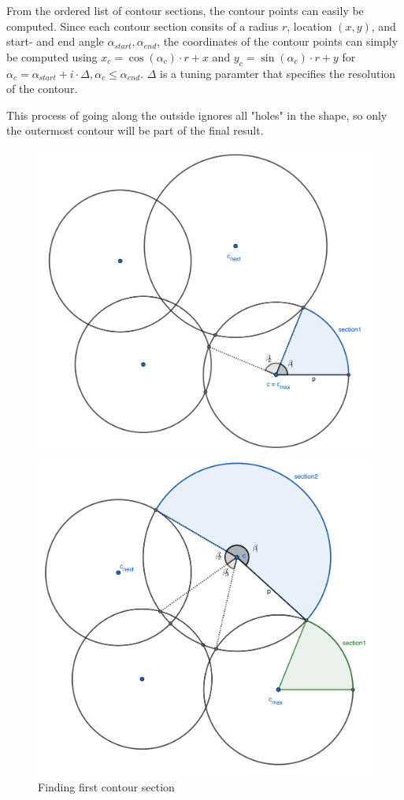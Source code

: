 From the ordered list of contour sections, the contour points can easily be computed.
Since each contour section consits of a radius $r$, location $(x,y)$, and start- and end angle $\alpha_{start}, \alpha_{end}$, the coordinates of the contour points can simply be computed using $x_c = \cos(\alpha_c) \cdot r + x$ and  $y_c = \sin(\alpha_c) \cdot r + y$ 
for $\alpha_c = \alpha_{start} + i \cdot \Delta, \alpha_c \leq \alpha_{end}$.
$\Delta$ is a tuning paramter that specifies the resolution of the contour.

This process of going along the outside ignores all "holes" in the shape, so only the outermost contour will be part of the final result. 

\begin{figure}[!htb]
    \includegraphics[width=1.0\textwidth]{figures/contour/c1copy.pdf}
    \caption{Finding first contour section}\label{fig:contour1}
  \endminipage\hfill
    \includegraphics[width=1.0\textwidth]{figures/contour/c2copy.pdf}

\end{figure}
